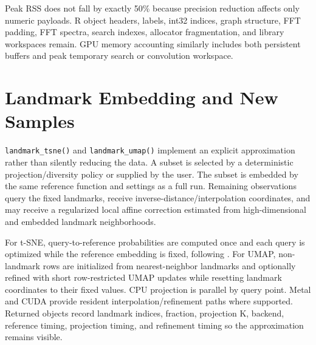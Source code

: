 \documentclass[twoside,11pt]{article}
\begin{document}
Peak RSS does not fall by exactly 50\% because precision reduction affects only numeric payloads. R object headers, labels, int32 indices, graph structure, FFT padding, FFT spectra, search indexes, allocator fragmentation, and library workspaces remain. GPU memory accounting similarly includes both persistent buffers and peak temporary search or convolution workspace.

\section{Landmark Embedding and New Samples}

\texttt{landmark\_tsne()} and \texttt{landmark\_umap()} implement an explicit approximation rather than silently reducing the data. A subset is selected by a deterministic projection/diversity policy or supplied by the user. The subset is embedded by the same reference function and settings as a full run. Remaining observations query the fixed landmarks, receive inverse-distance/interpolation coordinates, and may receive a regularized local affine correction estimated from high-dimensional and embedded landmark neighborhoods.

For t-SNE, query-to-reference probabilities are computed once and each query is optimized while the reference embedding is fixed, following \citet{policar2021}. For UMAP, non-landmark rows are initialized from nearest-neighbor landmarks and optionally refined with short row-restricted UMAP updates while resetting landmark coordinates to their fixed values. CPU projection is parallel by query point. Metal and CUDA provide resident interpolation/refinement paths where supported. Returned objects record landmark indices, fraction, projection K, backend, reference timing, projection timing, and refinement timing so the approximation remains visible.
\end{document}
